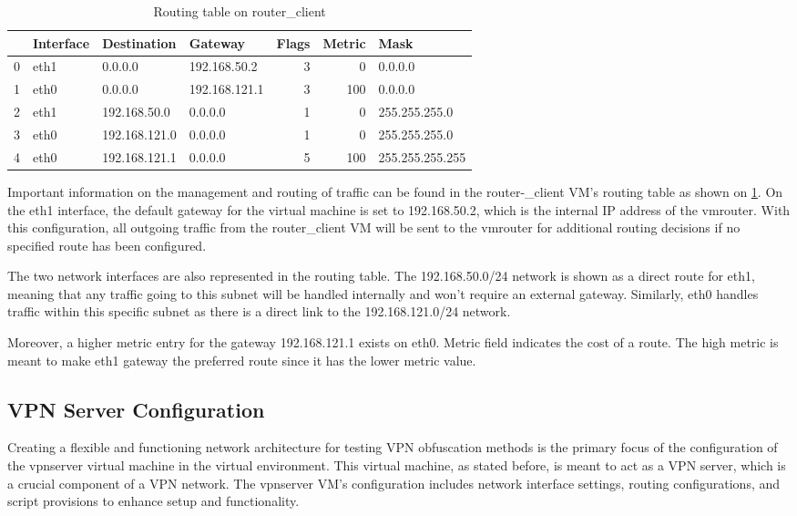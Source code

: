 \documentclass[12pt, fleqn, a4paper]{article}
\begin{document}
\begin{table}[H]
	\caption{Routing table on router\_client}
	\centering
  \begin{tabular}{llllrrl}
\toprule
{} & Interface &    Destination &        Gateway &  Flags &  Metric &             Mask \\
\midrule
0 &      eth1 &        0.0.0.0 &   192.168.50.2 &      3 &       0 &          0.0.0.0 \\
1 &      eth0 &        0.0.0.0 &  192.168.121.1 &      3 &     100 &          0.0.0.0 \\
2 &      eth1 &   192.168.50.0 &        0.0.0.0 &      1 &       0 &    255.255.255.0 \\
3 &      eth0 &  192.168.121.0 &        0.0.0.0 &      1 &       0 &    255.255.255.0 \\
4 &      eth0 &  192.168.121.1 &        0.0.0.0 &      5 &     100 &  255.255.255.255 \\
\bottomrule
\end{tabular}
  \label{tab:routerslave2}
\end{table}
Important information on the management and routing of traffic can be found in the router-\_client VM's routing table as shown on \cref{tab:routerslave2}. On the eth1 interface, the default gateway for the virtual machine is set to 192.168.50.2, which is the internal IP address of the vmrouter. With this configuration, all outgoing traffic from the router\_client VM will be sent to the vmrouter for additional routing decisions if no specified route has been configured.

The two network interfaces are also represented in the routing table. The 192.168.50.0/24 network is shown as a direct route for eth1, meaning that any traffic going to this subnet will be handled internally and won't require an external gateway. Similarly, eth0 handles traffic within this specific subnet as there is a direct link to the 192.168.121.0/24 network.

Moreover, a higher metric entry for the gateway 192.168.121.1 exists on eth0. Metric field indicates the cost of a route. The high metric is meant to make eth1 gateway the preferred route since it has the lower metric value.
\subsection{VPN Server Configuration}
Creating a flexible and functioning network architecture for testing VPN obfuscation methods is the primary focus of the configuration of the vpnserver virtual machine  in the virtual environment. This virtual machine, as stated before, is meant to act as a VPN server, which is a crucial component of a VPN network. The vpnserver VM's configuration includes network interface settings, routing configurations, and script provisions to enhance setup and functionality.
\end{document}
